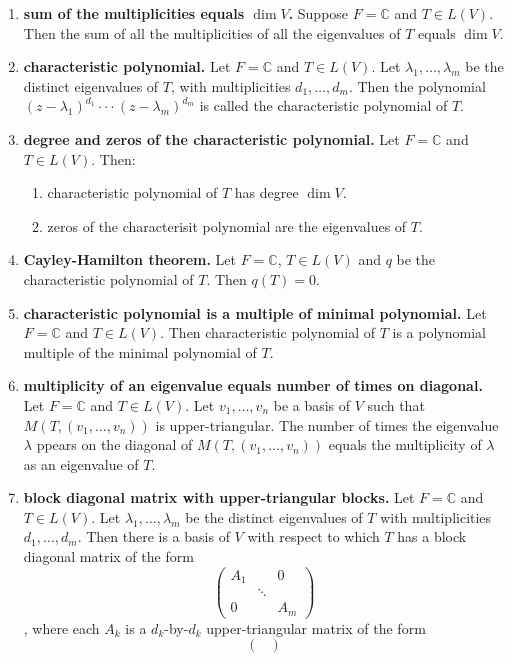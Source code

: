 \begin{enumerate}
	\item \textbf{sum of the multiplicities equals $\dim V$. } Suppose $F=\mathbb{C}$ and $T \in L(V)$. Then the sum of all the multiplicities of all the eigenvalues of $T$ equals $\dim V$. 
	\item \textbf{characteristic polynomial. } Let $F = \mathbb{C}$ and $T \in L(V)$. Let $\lambda_1,\dots,\lambda_m$ be the distinct eigenvalues of $T$, with multiplicities $d_1,\dots,d_m$. Then the polynomial $(z - \lambda_1)^{d_1} \cdot \cdot \cdot (z - \lambda_m)^{d_m}$ is called the characteristic polynomial of $T$. 
	\item \textbf{degree and zeros of the characteristic polynomial. } Let $F = \mathbb{C}$ and $T \in L(V)$. Then: 
	\begin{enumerate}
		\item characteristic polynomial of $T$ has degree $\dim V$. 
		\item zeros of the characterisit polynomial are the eigenvalues of $T$. 
	\end{enumerate}
	\item \textbf{Cayley-Hamilton theorem. } Let $F = \mathbb{C}$, $T \in L(V)$ and $q$ be the characteristic polynomial of $T$. Then $q(T) = 0$. 
	\item \textbf{characteristic polynomial is a multiple of minimal polynomial. } Let $F = \mathbb{C}$ and $T \in L(V)$. Then characteristic polynomial of $T$ is a polynomial multiple of the minimal polynomial of $T$. 
	\item \textbf{multiplicity of an eigenvalue equals number of times on diagonal. } Let $F = \mathbb{C}$ and $T \in L(V)$. Let $v_1,\dots,v_n$ be a basis of $V$ such that $M(T,(v_1,\dots,v_n))$ is upper-triangular. The number of times the eigenvalue $\lambda$ ppears on the diagonal of $M(T,(v_1,\dots,v_n))$ equals the multiplicity of $\lambda$ as an eigenvalue of $T$. 
	\item \textbf{block diagonal matrix with upper-triangular blocks. } Let $F = \mathbb{C}$ and $T \in L(V)$. Let $\lambda_1,\dots,\lambda_m$ be the distinct eigenvalues of $T$ with multiplicities $d_1,\dots,d_m$. Then there is a basis of $V$ with respect to which $T$ has a block diagonal matrix of the form 
	$$
	\begin{pmatrix}
	A_1 & & 0 \\
	 & \ddots &  \\
	0 & & A_m
	\end{pmatrix}
	$$, where each $A_k$ is a $d_k$-by-$d_k$ upper-triangular matrix of the form 
	$$
	\begin{pmatrix}

\end{pmatrix}$$
\end{enumerate}
